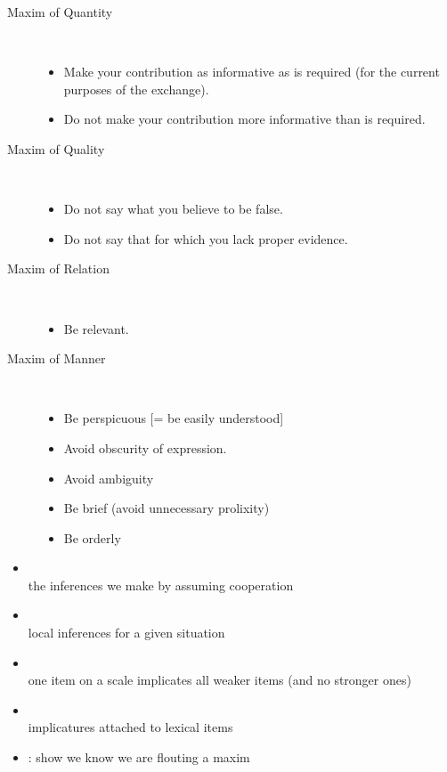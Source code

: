 \documentclass[headrule,footrule]{foils}
\begin{document}
\begin{small}
\begin{description}
\item [Maxim of Quantity] ~
  \begin{itemize}
  \item Make your contribution as informative as is required (for the current purposes of the exchange).
  \item Do not make your contribution more informative than is required.
  \end{itemize}
\item [Maxim of Quality] ~
  \begin{itemize}
  \item Do not say what you believe to be false.
  \item Do not say that for which you lack proper evidence.
  \end{itemize}
\item [Maxim of Relation] ~
  \begin{itemize}
  \item Be relevant.
  \end{itemize}
\item [Maxim of Manner] ~
  \begin{itemize}
  \item Be perspicuous [= be easily understood]
  \item Avoid obscurity of expression.
  \item Avoid ambiguity
  \item Be brief (avoid unnecessary prolixity)
  \item Be orderly
  \end{itemize}
\end{description}
\end{small}
\begin{itemize}
\item {}
\\ the inferences we make by assuming cooperation
\item {}
\\ local inferences for a given situation
\item {}
\\ one item on  a scale implicates all weaker items (and no stronger ones)
\item {}
\\ implicatures attached to lexical items
\item {}: show we know we are flouting a maxim
\end{itemize}
\end{document}
